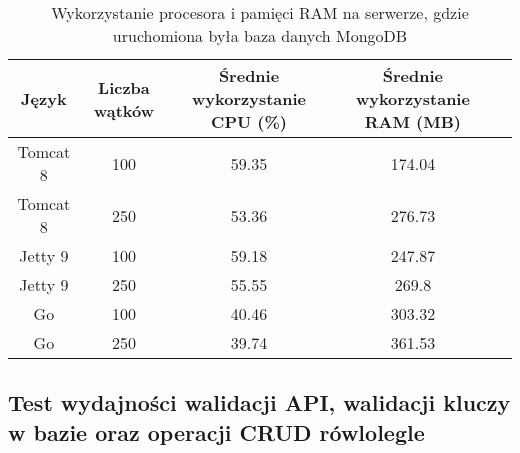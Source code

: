 \begin{table}[!htb]
\centering
\caption{Wykorzystanie procesora i pamięci RAM na serwerze, gdzie uruchomiona była baza danych MongoDB}
\label{tab:mongo-clean-crud}
\begin{tabular}{@{}ccccl@{}}
\toprule
\textbf{Język} & \textbf{Liczba wątków} & \multicolumn{1}{p{3cm}}{\textbf{Średnie wykorzystanie CPU (\%)}} & \multicolumn{1}{p{3cm}}{\textbf{Średnie wykorzystanie RAM (MB)}} &  \\ \midrule
Tomcat 8       & 100                    & 59.35                             & 174.04                          &  \\
Tomcat 8       & 250                    & 53.36                             & 276.73                          &  \\
Jetty 9       & 100                    & 59.18                             & 247.87                          &  \\
Jetty 9       & 250                    & 55.55                             & 269.8                          &  \\
Go       & 100                    & 40.46                             & 303.32                          &  \\
Go       & 250                    & 39.74                             & 361.53                          &  \\
\bottomrule
\end{tabular}
\end{table}

 \newpage
 \subsection{Test wydajności walidacji API, walidacji kluczy w bazie oraz operacji CRUD rówlolegle }

 \clearpage

